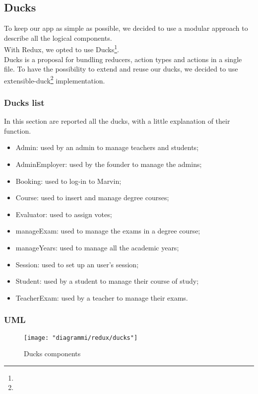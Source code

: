 \documentclass[../redux]{subfiles}
\begin{document}
	\subsection{Ducks}
	To keep our app as simple as possible, we decided to use a modular approach to describe all the logical components.\\
	With Redux, we opted to use Ducks\footnote{}.\\
	Ducks is a proposal for bundling reducers, action types and actions in a single file. To have the possibility to extend and reuse our ducks, we decided to use extensible-duck\footnote{} implementation.

	\subsubsection{Ducks list}
	In this section are reported all the ducks, with a little explanation of their function.
	\begin{itemize}
		\item Admin: used by an admin to manage teachers and students;
		\item AdminEmployer: used by the founder to manage the admins;
		\item Booking: used to log-in to Marvin;
		\item Course: used to insert and manage degree courses;
		\item Evaluator: used to assign votes;
		\item manageExam: used to manage the exams in a degree course;
		\item manageYears: used to manage all the academic years;
		\item Session: used to set up an user's session;
		\item Student: used by a student to manage their course of study;
		\item TeacherExam: used by a teacher to manage their exams.
	\end{itemize}

	\subsubsection{UML}
	\begin{figure}[H]
		\centering
		\texttt{[image: "diagrammi/redux/ducks"]}
		\caption{Ducks components}
		\label{fig:Ducks components}
	\end{figure}
\end{document}
